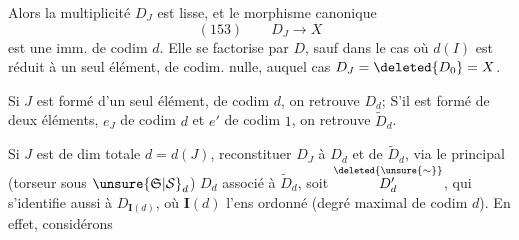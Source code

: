 
Alors la multiplicité $D_J$ est lisse,  et le morphisme canonique
\[
(153)\qquad D_J\longrightarrow X
\]
est une imm.  de codim $d$.
Elle se factorise par $D$, sauf dans le cas où $d(I)$ est réduit à un seul élément, de codim. nulle, auquel cas $D_J=\deleted{D_0}=X$.

Si $J$ est formé d'un seul élément, de codim $d$, on retrouve $D_d$; S'il est formé de deux éléments,  $e_J$ de codim $d$ et $e'$ de codim $1$, on retrouve $\widetilde D_d$.

Si $J$ est de dim totale $d=d(J)$,   reconstituer $D_J$ à  $D_d$ et de $\widetilde D_d$, via le  principal (torseur sous $\unsure{\mathfrak S|\mathcal S}_d$)  $D_d$ associé à $\widetilde D_d$, soit $\overset{\deleted{\unsure{\sim}}}{D'_d}$, qui s'identifie aussi à $D_{\mathbf I(d)}$, où $\mathbf I(d)$ l'ens ordonné
(degré maximal de codim $d$). En effet, considérons
